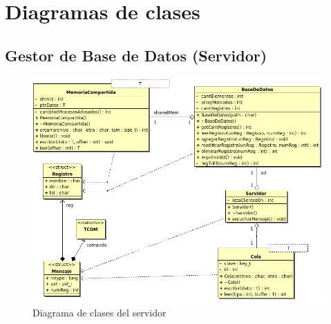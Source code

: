 \documentclass[a4paper,10pt]{article}
\begin{document}
%		
%	
%	
%	

\section{Diagramas de clases}
\subsection{Gestor de Base de Datos (Servidor)}
\begin{figure}[!htpb]
    \centering
    \includegraphics[width=12cm]{server.png}
    \caption{Diagrama de clases del servidor}
\end{figure}
\end{document}
